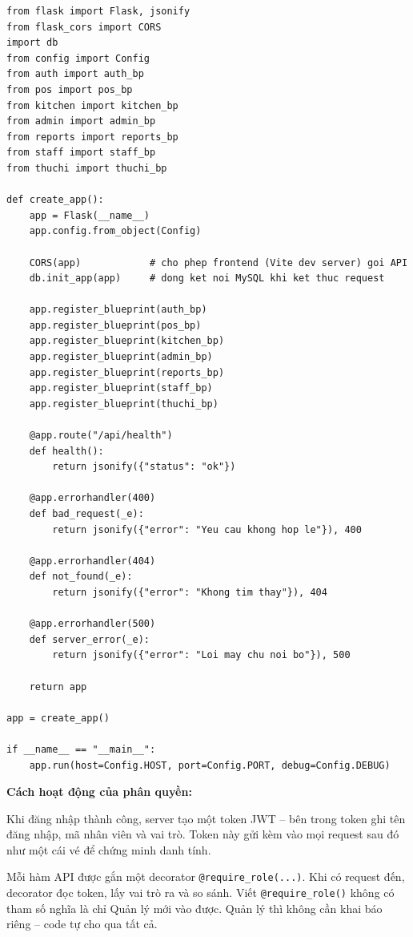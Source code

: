 \documentclass[12pt,a4paper]{report}
\newcommand{\code}[1]{\texttt{#1}}
\begin{document}
\begin{lstlisting}[style=mypython,
  caption={File \texttt{app.py} -- App-factory: đăng ký blueprint và khởi tạo Flask},
  label=lst:python-app]
from flask import Flask, jsonify
from flask_cors import CORS
import db
from config import Config
from auth import auth_bp
from pos import pos_bp
from kitchen import kitchen_bp
from admin import admin_bp
from reports import reports_bp
from staff import staff_bp
from thuchi import thuchi_bp

def create_app():
    app = Flask(__name__)
    app.config.from_object(Config)

    CORS(app)            # cho phep frontend (Vite dev server) goi API
    db.init_app(app)     # dong ket noi MySQL khi ket thuc request

    app.register_blueprint(auth_bp)
    app.register_blueprint(pos_bp)
    app.register_blueprint(kitchen_bp)
    app.register_blueprint(admin_bp)
    app.register_blueprint(reports_bp)
    app.register_blueprint(staff_bp)
    app.register_blueprint(thuchi_bp)

    @app.route("/api/health")
    def health():
        return jsonify({"status": "ok"})

    @app.errorhandler(400)
    def bad_request(_e):
        return jsonify({"error": "Yeu cau khong hop le"}), 400

    @app.errorhandler(404)
    def not_found(_e):
        return jsonify({"error": "Khong tim thay"}), 404

    @app.errorhandler(500)
    def server_error(_e):
        return jsonify({"error": "Loi may chu noi bo"}), 500

    return app

app = create_app()

if __name__ == "__main__":
    app.run(host=Config.HOST, port=Config.PORT, debug=Config.DEBUG)
\end{lstlisting}

\textbf{Cách hoạt động của phân quyền:}

Khi đăng nhập thành công, server tạo một token JWT -- bên trong token ghi tên đăng nhập, mã nhân viên và vai trò. Token này gửi kèm vào mọi request sau đó như một cái vé để chứng minh danh tính.

Mỗi hàm API được gắn một decorator \code{@require\_role(...)}. Khi có request đến, decorator đọc token, lấy vai trò ra và so sánh. Viết \code{@require\_role()} không có tham số nghĩa là chỉ Quản lý mới vào được. Quản lý thì không cần khai báo riêng -- code tự cho qua tất cả.
\end{document}
